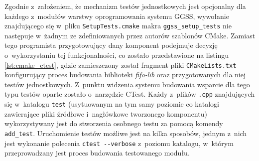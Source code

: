 


Zgodnie z~założeniem, że mechanizm testów jednostkowych jest opcjonalny dla każdego z~modułów warstwy oprogramowania systemu GGSS, wywołanie znajdującego się w~pliku \lstinline{SetupTests.cmake} makra \lstinline{ggss_setup_tests} nie następuje w~żadnym ze zdefiniowanych przez autorów szablonów CMake. Zamiast tego programista przygotowujący dany komponent podejmuje decyzję o~wykorzystaniu tej funkcjonalności, co zostało przedstawione na listingu \ref{lst:cmake_ctest}, gdzie zamieszczony został fragment pliki \lstinline{CMakeLists.txt} konfigurujący proces budowania biblioteki \emph{fifo-lib} oraz przygotowanych dla niej testów jednostkowych. Z~punktu widzenia systemu budowania wsparcie dla tego typu testów oparte zostało o~narzędzie CTest. Każdy z~plików \lstinline{.cpp} znajdujących się w~katalogu \lstinline{test} (usytuowanym na tym samy poziomie co katalogi zawierające pliki źródłowe i~nagłówkowe tworzonego komponentu) wykorzystywany jest do stworzenia osobnego testu za pomocą komendy \lstinline{add_test}. Uruchomienie testów możliwe jest na kilka sposobów, jednym z~nich jest wykonanie polecenia \lstinline{ctest --verbose} z~poziomu katalogu, w~którym przeprowadzany jest proces budowania testowanego modułu.

\clearpage



